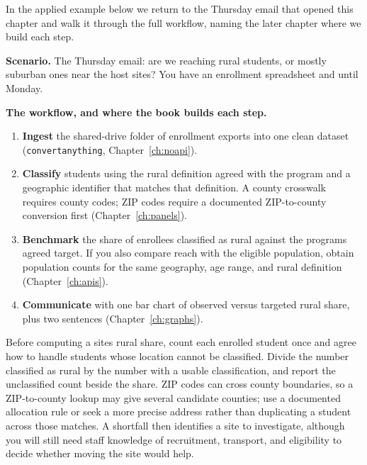 \documentclass[
    a4paper,
    fontsize=10pt,
    twoside=true,
    numbers=noenddot,
]{kaobook}
\newcounter{appliedexample}
\newenvironment{appliedexample}[1][]{%
    \refstepcounter{appliedexample}%
    \begin{appliedexamplebox}[frametitle={Applied Example~\theappliedexample.~~#1}]%
}{%
    \end{appliedexamplebox}%
}
\begin{document}
In the applied example below we return to the Thursday email that opened this chapter and walk it through the full workflow, naming the later chapter where we build each step.

\begin{appliedexample}[From a funder's question to a one-page answer]\label{ae:ch01-funder}
\textbf{Scenario.} The Thursday email: are we reaching rural students, or mostly suburban ones near the host sites? You have an enrollment spreadsheet and until Monday.

\medskip
\textbf{The workflow, and where the book builds each step.}
\begin{enumerate}
    \item \textbf{Ingest} the shared-drive folder of enrollment exports into one clean dataset (\texttt{convertanything}, Chapter~\ref{ch:noapi}).
    \item \textbf{Classify} students using the rural definition agreed with the program and a geographic identifier that matches that definition. A county crosswalk requires county codes; ZIP codes require a documented ZIP-to-county conversion first (Chapter~\ref{ch:panels}).
    \item \textbf{Benchmark} the share of enrollees classified as rural against the program\textquotesingle s agreed target. If you also compare reach with the eligible population, obtain population counts for the same geography, age range, and rural definition (Chapter~\ref{ch:apis}).
    \item \textbf{Communicate} with one bar chart of observed versus targeted rural share, plus two sentences (Chapter~\ref{ch:graphs}).
\end{enumerate}
Before computing a site\textquotesingle s rural share, count each enrolled student once and agree how to handle students whose location cannot be classified. Divide the number classified as rural by the number with a usable classification, and report the unclassified count beside the share. ZIP codes can cross county boundaries, so a ZIP-to-county lookup may give several candidate counties; use a documented allocation rule or seek a more precise address rather than duplicating a student across those matches. A shortfall then identifies a site to investigate, although you will still need staff knowledge of recruitment, transport, and eligibility to decide whether moving the site would help.
\end{appliedexample}
\end{document}
